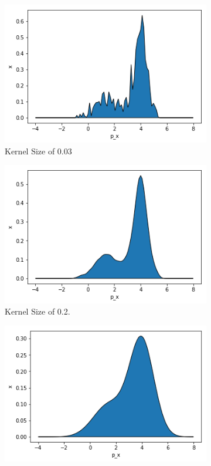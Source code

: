 \begin{questions}
\begin{figure}[H]
	\centering
	\begin{subfigure}[b]{0.3\linewidth}
		\includegraphics[width=\linewidth]{pictures/kd003.png}
		\caption{Kernel Size of 0.03}
		\label{fig:kd003}
	\end{subfigure}
	\begin{subfigure}[b]{0.3\linewidth}
		\includegraphics[width=\linewidth]{pictures/kd02.png}
		\caption{Kernel Size of 0.2.}
		\label{fig:kd02}
	\end{subfigure}
	\begin{subfigure}[b]{0.3\linewidth}
	\includegraphics[width=\linewidth]{pictures/kd08.png}

\end{subfigure}
\end{figure}
\end{questions}

